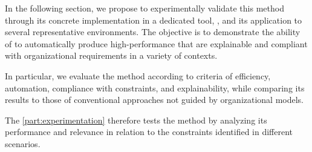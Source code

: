 
\noindent
In the following section, we propose to experimentally validate this method through its concrete implementation in a dedicated tool, , and its application to several representative environments. The objective is to demonstrate the ability of  to automatically produce high-performance  that are explainable and compliant with organizational requirements in a variety of contexts.

\medskip

\noindent
In particular, we evaluate the method according to criteria of efficiency, automation, compliance with constraints, and explainability, while comparing its results to those of conventional approaches not guided by organizational models.

\bigskip

The \autoref{part:experimentation} therefore tests the  method by analyzing its performance and relevance in relation to the constraints identified in different scenarios.